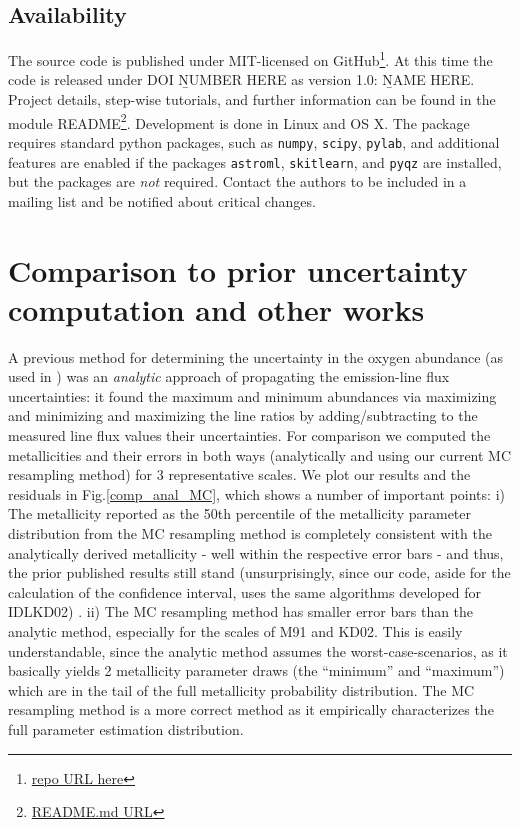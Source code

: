 \documentclass{emulateapj}
\begin{document}
 




\subsection{Availability}
The source code is published under MIT-licensed on GitHub\footnote{\url{repo URL here}}. At this time the code is released under DOI {\b NUMBER HERE} as version 1.0: {\b NAME HERE}. Project
details, step-wise tutorials, and further information can be found in the module README\footnote{\url{README.md URL}}.
Development is done in Linux and OS X. The package requires standard python packages, such as \verb=numpy=, \verb=scipy=, \verb=pylab=, and additional features are enabled if the packages \verb=astroml=, \verb=skitlearn=, and \verb=pyqz= are installed, but the packages are \emph{not} required. Contact the authors to be included in a mailing list and be notified about critical changes. 




\section{Comparison to prior uncertainty computation and other works }\label{comp_sec}


A previous method for determining the uncertainty in the oxygen abundance (as used in \citealt{modjaz08_Z,kewley10,rupke10,modjaz11}) was an \emph{analytic} approach of propagating the emission-line flux uncertainties: it found the maximum and minimum abundances via maximizing and minimizing and maximizing the line ratios by adding/subtracting to the measured line flux values their uncertainties. For comparison we computed the metallicities and their errors in both ways (analytically and using our current MC resampling method) for 3 representative scales. We plot our results and the residuals in Fig.\ref{comp_anal_MC}, which shows a number of important points: i) The metallicity reported as the 50th percentile of the metallicity parameter distribution from the MC resampling method is completely consistent with the analytically derived metallicity -  well within the respective error bars - and thus, the prior published results still stand (unsurprisingly, since our code, aside for the calculation of the confidence interval, uses the same algorithms developed for IDLKD02)
. ii) The MC resampling method has smaller error bars than the analytic method, especially for the scales of M91 and KD02. This is easily understandable, since the analytic method assumes the worst-case-scenarios, as it basically yields 2 metallicity parameter draws (the ``minimum'' and ``maximum'') which are in the tail of the full metallicity probability distribution. The MC resampling method is a more correct method as it empirically characterizes the full parameter estimation distribution.
\end{document}
